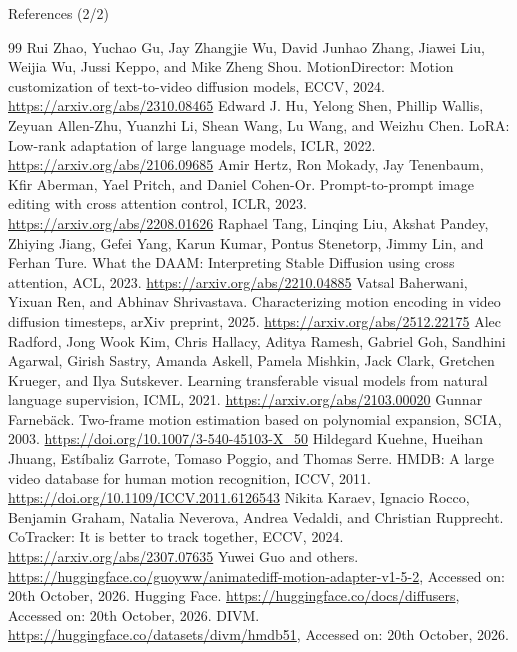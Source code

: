 \documentclass[aspectratio=169,11pt]{beamer}
\begin{document}
\begin{frame}{References (2/2)}
  \tiny
  \begin{thebibliography}{99}\setlength{\itemsep}{0pt}\setcounter{enumiv}{12}
   Rui Zhao, Yuchao Gu, Jay Zhangjie Wu, David Junhao Zhang, Jiawei Liu, Weijia Wu, Jussi Keppo, and Mike Zheng Shou. MotionDirector: Motion customization of text-to-video diffusion models, ECCV, 2024. \url{https://arxiv.org/abs/2310.08465}
   Edward J. Hu, Yelong Shen, Phillip Wallis, Zeyuan Allen-Zhu, Yuanzhi Li, Shean Wang, Lu Wang, and Weizhu Chen. LoRA: Low-rank adaptation of large language models, ICLR, 2022. \url{https://arxiv.org/abs/2106.09685}
   Amir Hertz, Ron Mokady, Jay Tenenbaum, Kfir Aberman, Yael Pritch, and Daniel Cohen-Or. Prompt-to-prompt image editing with cross attention control, ICLR, 2023. \url{https://arxiv.org/abs/2208.01626}
   Raphael Tang, Linqing Liu, Akshat Pandey, Zhiying Jiang, Gefei Yang, Karun Kumar, Pontus Stenetorp, Jimmy Lin, and Ferhan Ture. What the DAAM: Interpreting Stable Diffusion using cross attention, ACL, 2023. \url{https://arxiv.org/abs/2210.04885}
   Vatsal Baherwani, Yixuan Ren, and Abhinav Shrivastava. Characterizing motion encoding in video diffusion timesteps, arXiv preprint, 2025. \url{https://arxiv.org/abs/2512.22175}
   Alec Radford, Jong Wook Kim, Chris Hallacy, Aditya Ramesh, Gabriel Goh, Sandhini Agarwal, Girish Sastry, Amanda Askell, Pamela Mishkin, Jack Clark, Gretchen Krueger, and Ilya Sutskever. Learning transferable visual models from natural language supervision, ICML, 2021. \url{https://arxiv.org/abs/2103.00020}
   Gunnar Farneb\"ack. Two-frame motion estimation based on polynomial expansion, SCIA, 2003. \url{https://doi.org/10.1007/3-540-45103-X_50}
   Hildegard Kuehne, Hueihan Jhuang, Est\'ibaliz Garrote, Tomaso Poggio, and Thomas Serre. HMDB: A large video database for human motion recognition, ICCV, 2011. \url{https://doi.org/10.1109/ICCV.2011.6126543}
   Nikita Karaev, Ignacio Rocco, Benjamin Graham, Natalia Neverova, Andrea Vedaldi, and Christian Rupprecht. CoTracker: It is better to track together, ECCV, 2024. \url{https://arxiv.org/abs/2307.07635}
   Yuwei Guo and others. \url{https://huggingface.co/guoyww/animatediff-motion-adapter-v1-5-2}, Accessed on: 20th October, 2026.
   Hugging Face. \url{https://huggingface.co/docs/diffusers}, Accessed on: 20th October, 2026.
   DIVM. \url{https://huggingface.co/datasets/divm/hmdb51}, Accessed on: 20th October, 2026.
  \end{thebibliography}
\end{frame}
\end{document}
